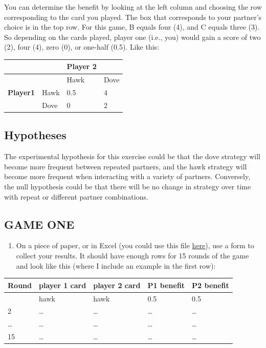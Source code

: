 \documentclass[
  a4paper]{book}
\providecommand{\tightlist}{%
  \setlength{\itemsep}{0pt}\setlength{\parskip}{0pt}}
\begin{document}
You can determine the benefit by looking at the left column and choosing the row corresponding to the card you played. The box that corresponds to your partner's choice is in the top row. For this game, B equals four (4), and C equals three (3). So depending on the cards played, player one (i.e., you) would gain a score of two (2), four (4), zero (0), or one-half (0.5). Like this:

\begin{longtable}[]{@{}llll@{}}
\toprule\noalign{}
& & Player 2 & \\
\midrule\noalign{}
\endhead
\bottomrule\noalign{}
\endlastfoot
& & Hawk & Dove \\
\textbf{Player1} & Hawk & 0.5 & 4 \\
& Dove & 0 & 2 \\
\end{longtable}

\hypertarget{hypotheses}{%
\subsection{Hypotheses}\label{hypotheses}}

The experimental hypothesis for this exercise could be that the dove strategy will become more frequent between repeated partners, and the hawk strategy will become more frequent when interacting with a variety of partners. Conversely, the null hypothesis could be that there will be no change in strategy over time with repeat or different partner combinations.

\hypertarget{game-one}{%
\subsection{GAME ONE}\label{game-one}}

\begin{enumerate}
\def\labelenumi{\arabic{enumi}.}
\setcounter{enumi}{-1}
\tightlist
\item
  On a piece of paper, or in Excel (you could use this file \href{https://www.dropbox.com/s/48lypfd6o0hi46e/Table_2_Group_behavior.xlsx?dl=1}{here}), use a form to collect your results. It should have enough rows for 15 rounds of the game and look like this (where I include an example in the first row):
\end{enumerate}

\begin{longtable}[]{@{}lllll@{}}
\toprule\noalign{}
Round & player 1 card & player 2 card & P1 benefit & P2 benefit \\
\midrule\noalign{}
\endhead
\bottomrule\noalign{}
\endlastfoot
1 & hawk & hawk & 0.5 & 0.5 \\
2 & \ldots{} & \ldots{} & \ldots{} & \ldots{} \\
\ldots{} & \ldots{} & \ldots{} & \ldots{} & \ldots{} \\
15 & \ldots{} & \ldots{} & \ldots{} & \ldots{} \\
\end{longtable}
\end{document}
